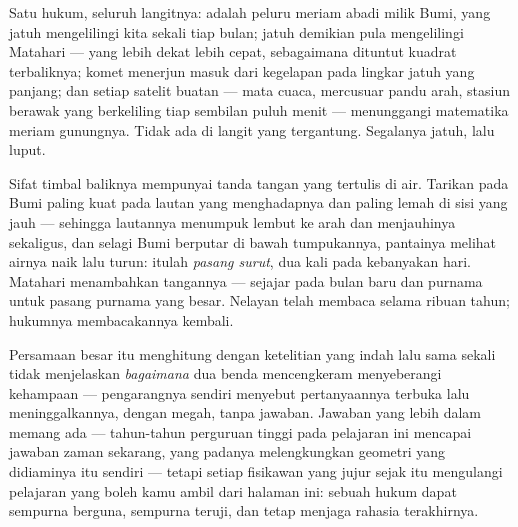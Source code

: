 \begin{proposition}\label{prop:g9:gravitation:runs}
Satu hukum, seluruh langitnya:  adalah peluru meriam abadi milik
Bumi, yang jatuh mengelilingi kita sekali tiap bulan;  jatuh
demikian pula mengelilingi Matahari --- yang lebih dekat lebih cepat,
sebagaimana dituntut kuadrat terbaliknya; komet menerjun masuk dari
kegelapan pada lingkar jatuh yang panjang; dan setiap satelit buatan
--- mata cuaca, mercusuar pandu arah, stasiun berawak yang berkeliling
tiap sembilan puluh menit --- menunggangi matematika meriam gunungnya.
Tidak ada di langit yang tergantung. Segalanya jatuh, lalu luput.
\end{proposition}

\begin{example}\label{ex:g9:gravitation:tides}
Sifat timbal baliknya mempunyai tanda tangan yang tertulis di air.
Tarikan  pada Bumi paling kuat pada lautan yang menghadapnya dan
paling lemah di sisi yang jauh --- sehingga lautannya menumpuk lembut
ke arah  dan menjauhinya sekaligus, dan selagi Bumi berputar di
bawah tumpukannya, pantainya melihat airnya naik lalu turun: itulah
\emph{pasang surut}, dua kali pada kebanyakan hari. Matahari
menambahkan tangannya --- sejajar pada bulan baru dan purnama untuk
pasang purnama yang besar. Nelayan telah membaca  selama
ribuan tahun; hukumnya membacakannya kembali.
\end{example}

\begin{remark}\label{rem:g9:gravitation:notsay}
Persamaan besar itu menghitung  dengan ketelitian yang indah
lalu sama sekali tidak menjelaskan \emph{bagaimana} dua benda
mencengkeram menyeberangi kehampaan --- pengarangnya sendiri menyebut
pertanyaannya terbuka lalu meninggalkannya, dengan megah, tanpa
jawaban. Jawaban yang lebih dalam memang ada --- tahun-tahun perguruan
tinggi pada pelajaran ini mencapai jawaban zaman sekarang, yang
padanya  melengkungkan geometri yang didiaminya itu sendiri ---
tetapi setiap fisikawan yang jujur sejak itu mengulangi pelajaran yang
boleh kamu ambil dari halaman ini: sebuah hukum dapat sempurna
berguna, sempurna teruji, dan tetap menjaga rahasia terakhirnya.
\end{remark}

